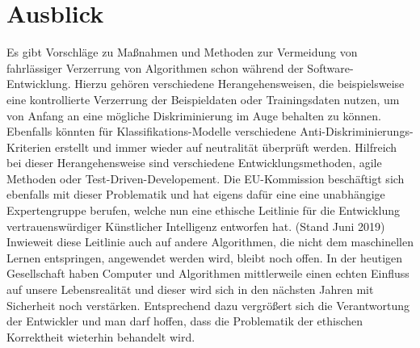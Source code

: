 \section{Ausblick}
Es gibt Vorschläge zu Maßnahmen und Methoden zur Vermeidung von fahrlässiger Verzerrung von Algorithmen schon während der Software-Entwicklung. Hierzu gehören verschiedene Herangehensweisen, die beispielsweise eine kontrollierte Verzerrung der Beispieldaten oder Trainingsdaten nutzen, um von Anfang an eine mögliche Diskriminierung im Auge behalten zu können. Ebenfalls könnten für Klassifikations-Modelle verschiedene Anti-Diskriminierungs-Kriterien erstellt und immer wieder auf neutralität überprüft werden. Hilfreich bei dieser Herangehensweise sind verschiedene Entwicklungsmethoden, agile Methoden oder Test-Driven-Developement. \newline 
Die EU-Kommission beschäftigt sich ebenfalls mit dieser Problematik und hat eigens dafür eine eine unabhängige Expertengruppe berufen, welche nun eine ethische Leitlinie für die Entwicklung vertrauenswürdiger Künstlicher Intelligenz entworfen hat. (Stand Juni 2019) \cite{europe2019} Inwieweit diese Leitlinie auch auf andere Algorithmen, die nicht dem maschinellen Lernen entspringen, angewendet werden wird, bleibt noch offen. 
\newline
In der heutigen Gesellschaft haben Computer und Algorithmen mittlerweile einen echten Einfluss auf unsere Lebensrealität und dieser wird sich in den nächsten Jahren mit Sicherheit noch verstärken. Entsprechend dazu vergrößert sich die Verantwortung der Entwickler und man darf hoffen, dass die Problematik der ethischen Korrektheit wieterhin behandelt wird.


